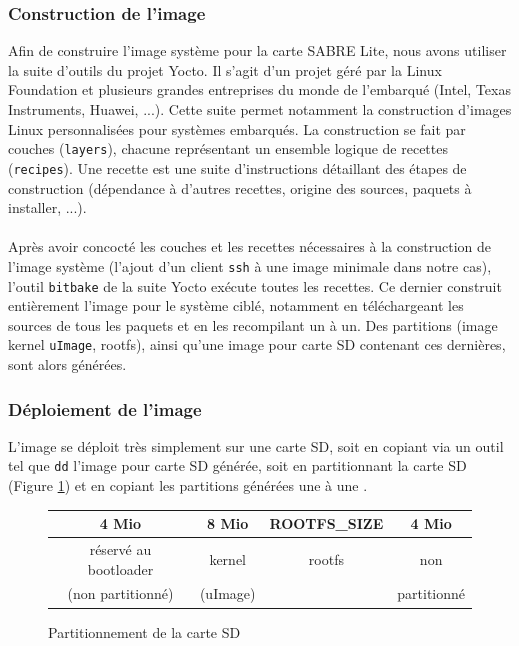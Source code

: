 \subsubsection{Construction de l'image}
Afin de construire l'image système pour la carte SABRE Lite, nous avons
utiliser la suite d'outils du projet Yocto\cite{hallinan_create_2015}. Il s'agit
d'un projet géré par la Linux Foundation et plusieurs grandes entreprises du
monde de l'embarqué (Intel, Texas Instruments, Huawei, ...). Cette suite permet
notamment la construction d'images Linux personnalisées pour systèmes embarqués.
La construction se fait par couches (\texttt{layers}), chacune représentant un
ensemble logique de recettes (\texttt{recipes}). Une recette est une suite
d'instructions détaillant des étapes de construction (dépendance à d'autres
recettes, origine des sources, paquets à installer, ...).

\paragraph{} Après avoir concocté les couches et les recettes nécessaires à la
construction de l'image système (l'ajout d'un client \texttt{ssh} à une image
minimale dans notre cas), l'outil \texttt{bitbake}\cite{purdie_bitbake_????}
de la suite Yocto exécute toutes les recettes. Ce dernier construit entièrement
l'image pour le système ciblé, notamment en téléchargeant les sources de tous
les paquets et en les recompilant un à un. Des partitions (image kernel
\texttt{uImage}, rootfs), ainsi qu'une image pour carte SD contenant ces
dernières, sont alors générées.

\subsubsection{Déploiement de l'image}
L'image se déploit très simplement sur une carte SD, soit en copiant via un
outil tel que \texttt{dd} l'image pour carte SD générée, soit en partitionnant
la carte SD (Figure \ref{partSD}) et en copiant les partitions générées une à
une \cite{angolini_yocto_2014}.

\begin{figure}
  \centering
  \begin{tabular}{|c|c|c|c|}
    4 Mio & 8 Mio & ROOTFS\_SIZE & 4 Mio \\
    \hline
    réservé au bootloader & kernel & rootfs & non \\
    (non partitionné) & (uImage) & & partitionné \\
  \end{tabular}
  \caption{Partitionnement de la carte SD}
  \label{partSD}
\end{figure}

